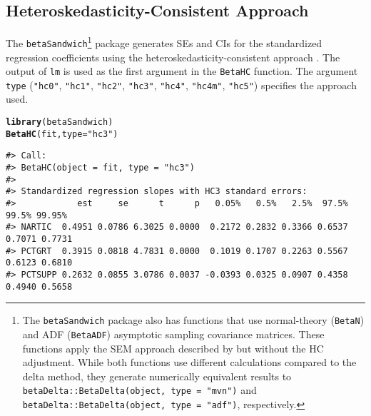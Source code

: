 \documentclass[man]{apa7}\usepackage[]{graphicx}\usepackage[]{xcolor}
\makeatletter
\newcommand{\hlstr}[1]{\textcolor[rgb]{0.192,0.494,0.8}{#1}}%
\newcommand{\hlstd}[1]{\textcolor[rgb]{0.345,0.345,0.345}{#1}}%
\newcommand{\hlkwc}[1]{\textcolor[rgb]{0.333,0.667,0.333}{#1}}%
\newcommand{\hlkwd}[1]{\textcolor[rgb]{0.737,0.353,0.396}{\textbf{#1}}}%
\newenvironment{kframe}{%
 \def\at@end@of@kframe{}%
 \ifinner\ifhmode%
  \def\at@end@of@kframe{\end{minipage}}%
  \begin{minipage}{\columnwidth}%
 \fi\fi%
 \def\FrameCommand##1{\hskip\@totalleftmargin \hskip-\fboxsep
 \colorbox{shadecolor}{##1}\hskip-\fboxsep
     \hskip-\linewidth \hskip-\@totalleftmargin \hskip\columnwidth}%
 \MakeFramed {\advance\hsize-\width
   \@totalleftmargin\z@ \linewidth\hsize
   \@setminipage}}%
 {\par\unskip\endMakeFramed%
 \at@end@of@kframe}
\newenvironment{knitrout}{}{} %
\makeatother
\begin{document}
\subsection{Heteroskedasticity-Consistent Approach}

The \texttt{betaSandwich}\footnote{The \texttt{betaSandwich} package also has functions that use normal-theory (\texttt{BetaN}) and ADF (\texttt{BetaADF}) asymptotic sampling covariance matrices.
These functions apply the SEM approach described by \Textcite{Lib-Regression-Standardized-Coefficients-HC-Dudgeon-2017}
but without the HC adjustment. 
While both functions use different calculations compared to the delta method, they generate numerically equivalent results to \texttt{betaDelta::BetaDelta(object, type = "mvn")} and \texttt{betaDelta::BetaDelta(object, type = "adf")}, respectively.} package
generates SEs and CIs
for the standardized regression coefficients
using the heteroskedasticity-consistent approach
\parencite{Lib-Regression-Standardized-Coefficients-HC-Dudgeon-2017}.
The output of \texttt{lm}
is used as the first argument in the \texttt{BetaHC} function.
The argument \texttt{type}
(\texttt{"hc0"},
\texttt{"hc1"},
\texttt{"hc2"},
\texttt{"hc3"},
\texttt{"hc4"},
\texttt{"hc4m"},
\texttt{"hc5"})
specifies the approach used.

\vspace{-.5em}
\begin{minipage}{.75\linewidth}
	\singlespacing
\begin{knitrout}\scriptsize
{}\color{fgcolor}\begin{kframe}
\begin{alltt}
\hlkwd{library}\hlstd{(betaSandwich)}
\hlkwd{BetaHC}\hlstd{(fit,} \hlkwc{type} \hlstd{=} \hlstr{"hc3"}\hlstd{)}
\end{alltt}
\begin{verbatim}
#> Call:
#> BetaHC(object = fit, type = "hc3")
#> 
#> Standardized regression slopes with HC3 standard errors:
#>            est     se      t      p   0.05%   0.5%   2.5%  97.5%  99.5% 99.95%
#> NARTIC  0.4951 0.0786 6.3025 0.0000  0.2172 0.2832 0.3366 0.6537 0.7071 0.7731
#> PCTGRT  0.3915 0.0818 4.7831 0.0000  0.1019 0.1707 0.2263 0.5567 0.6123 0.6810
#> PCTSUPP 0.2632 0.0855 3.0786 0.0037 -0.0393 0.0325 0.0907 0.4358 0.4940 0.5658
\end{verbatim}
\end{kframe}
\end{knitrout}
\end{minipage}
\end{document}
